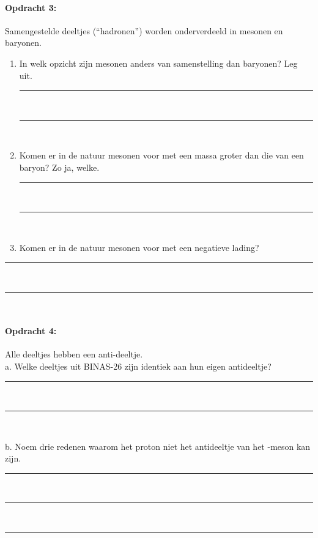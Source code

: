 \paragraph{Opdracht 3:}
Samengestelde deeltjes (``hadronen'') worden onderverdeeld in mesonen en baryonen.\\
\begin{enumerate}
\item In welk opzicht zijn mesonen anders van samenstelling dan baryonen? Leg uit.
\begin{center}
    \rule{\textwidth}{0.3mm}\\
    \rule{\textwidth}{0.3mm}\\
\end{center}
\item Komen er in de natuur mesonen voor met een massa groter dan die van een baryon?
Zo ja, welke.
\begin{center}
    \rule{\textwidth}{0.3mm}\\
    \rule{\textwidth}{0.3mm}\\
\end{center}
\item Komen er in de natuur mesonen voor met een negatieve lading?
\end{enumerate}
\begin{center}
    \rule{\textwidth}{0.3mm}\\
    \rule{\textwidth}{0.3mm}\\
\end{center}

\paragraph{Opdracht 4:}
Alle deeltjes hebben een anti-deeltje.\\
a. Welke deeltjes uit BINAS-26 zijn identiek aan hun eigen antideeltje?
\begin{center}
    \rule{\textwidth}{0.3mm}\\
    \rule{\textwidth}{0.3mm}\\
\end{center}
b. Noem drie redenen waarom het proton niet het antideeltje van het \Ppiplus-meson kan zijn.
\begin{center}
    \rule{\textwidth}{0.3mm}\\
    \rule{\textwidth}{0.3mm}\\
    \rule{\textwidth}{0.3mm}\\
\end{center}

